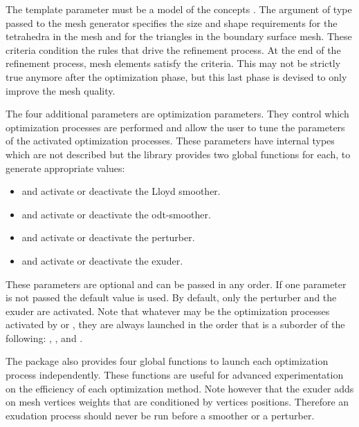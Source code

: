 
The template parameter  must be a model of the concepts
. 
The argument of
type  passed to the mesh generator specifies the
size and shape requirements for the tetrahedra in the mesh
and for the triangles in the boundary surface mesh. These criteria
condition the rules that drive the refinement process.  At the end 
of the refinement process, mesh elements satisfy the criteria.
This may not be strictly true anymore after the optimization phase, but this
last phase is devised to only improve the mesh quality.


The   four  additional parameters  are optimization parameters.
They control which optimization processes are performed
and allow the user  to tune the parameters of the activated  optimization processes.
These parameters have internal types which are not described
but the library provides two global functions for each, to generate
appropriate values:
\begin{itemize}
\item {} and  activate or deactivate  the Lloyd smoother.
 \item {} and  activate or deactivate the odt-smoother.
\item {} and  activate or deactivate the perturber.
\item {} and  activate or deactivate the exuder.
\end{itemize}


These parameters are optional and can be passed in any order.
If one parameter is not passed the default value is used. By default,
only the perturber and the exuder are activated.
Note that whatever may be the optimization processes activated by 
or ,
they are always launched in the order that is a suborder 
of the following:
, ,  and 
.


The package also provides four global functions to launch
each optimization process independently. These functions are useful for advanced experimentation 
on the efficiency of each optimization method.
Note however that the exuder adds on mesh vertices  weights that are conditioned by vertices
positions. Therefore an exudation process should never be run before
a smoother or a perturber. 


